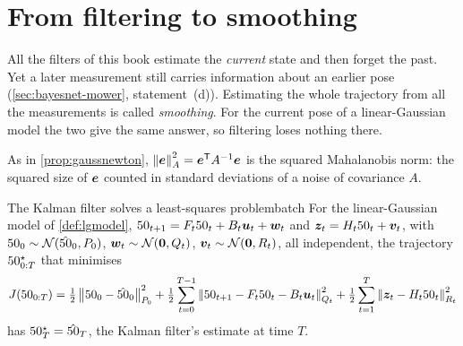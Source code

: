 \section{From filtering to smoothing}
\label{sec:smoothing}

All the filters of this book estimate the \emph{current} state and then
forget the past. Yet a later measurement still carries information about
an earlier pose (\cref{sec:bayesnet-mower}, statement~(d)). Estimating the
whole trajectory from all the measurements is called \emph{smoothing}. For
the current pose of a linear-Gaussian model the two give the same answer,
so filtering loses nothing there.

As in \cref{prop:gaussnewton}, $\left\lVert \bm{e}\right\rVert_A^2=\bm{e}^{\mathsf{T}} A^{-1}\bm{e}$
is the squared Mahalanobis norm: the squared size of $\bm{e}$ counted in
standard deviations of a noise of covariance $A$.

\begin{proposition}{The Kalman filter solves a least-squares problem}{batch}
For the linear-Gaussian model of \cref{def:lgmodel},
$50_{t+1}=F_t50_t+B_t\bm{u}_t+\bm{w}_t$ and $\bm{z}_t=H_t50_t+\bm{v}_t$, with
$50_0\sim\mathcal{N}(\hat{50}_0,P_0)$, $\bm{w}_t\sim\mathcal{N}(\bm{0},Q_t)$,
$\bm{v}_t\sim\mathcal{N}(\bm{0},R_t)$, all independent, the trajectory
$50^\star_{0:T}$ that minimises
\[
  J(50_{0:T})=\tfrac12\left\lVert 50_0-\hat{50}_0\right\rVert_{P_0}^2+\tfrac12\sum_{t=0}^{T-1}
  \left\lVert 50_{t+1}-F_t50_t-B_t\bm{u}_t\right\rVert_{Q_t}^2+\tfrac12\sum_{t=1}^T
  \left\lVert \bm{z}_t-H_t50_t\right\rVert_{R_t}^2
\]
has $50^\star_T=\hat{50}_T$, the Kalman filter's estimate at time $T$.
\end{proposition}

